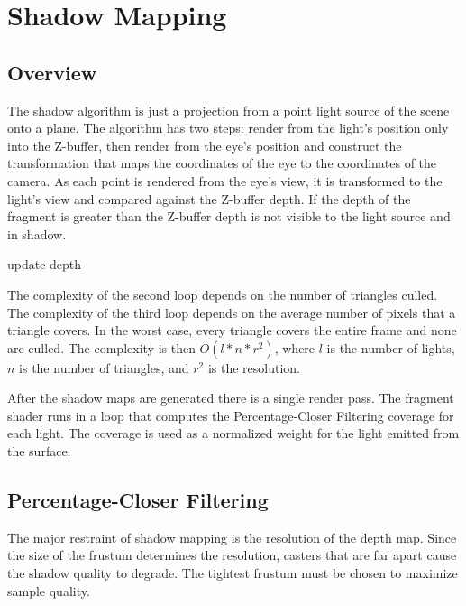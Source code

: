 \documentclass[12pt]{article}
\begin{document}
\section{Shadow Mapping}

\subsection{Overview}

The shadow algorithm is just a projection from a point light source of the scene onto a plane. The algorithm has two steps: render from the light's position only into the Z-buffer, then render from the eye's position and construct the transformation that maps the coordinates of the eye to the coordinates of the camera. As each point is rendered from the eye's view, it is transformed to the light's view and compared against the Z-buffer depth.
If the depth of the fragment is greater than the Z-buffer depth is not visible to the light source and in shadow.


\begin{algorithm}
{
	{
		{
			update depth
		}
	}
}
\end{algorithm}

The complexity of the second loop depends on the number of triangles culled. The complexity of the third loop depends on the average number of pixels that a triangle covers. In the worst case, every triangle covers the entire frame and none are culled.
The complexity is then \(O(l*n*r^2)\), where \(l\) is the number of lights, \(n\) is the number of triangles, and \(r^2\) is the resolution.

After the shadow maps are generated there is a single render pass. The fragment shader runs in a loop that computes the Percentage-Closer Filtering coverage for each light. The coverage is used as a normalized weight for the light emitted from the surface.


\subsection{Percentage-Closer Filtering}

The major restraint of shadow mapping is the resolution of the depth map. Since the size of the frustum determines the resolution, casters that are far apart cause the shadow quality to degrade. The tightest frustum must be chosen to maximize sample quality.
\end{document}
